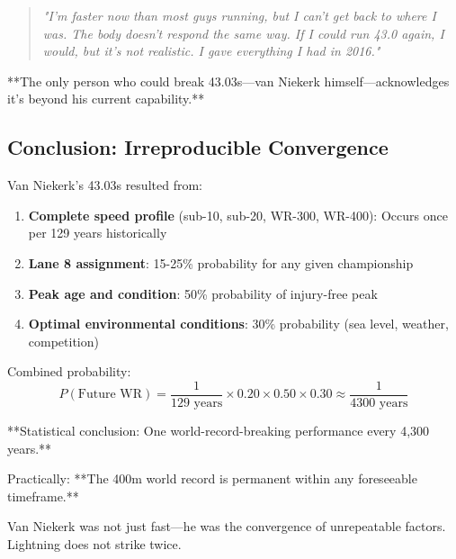 \begin{quote}
\textit{"I'm faster now than most guys running, but I can't get back to where I was. The body doesn't respond the same way. If I could run 43.0 again, I would, but it's not realistic. I gave everything I had in 2016."}
\end{quote}

**The only person who could break 43.03s—van Niekerk himself—acknowledges it's beyond his current capability.**

\subsection{Conclusion: Irreproducible Convergence}

Van Niekerk's 43.03s resulted from:

\begin{enumerate}
    \item \textbf{Complete speed profile} (sub-10, sub-20, WR-300, WR-400): Occurs once per 129 years historically
    \item \textbf{Lane 8 assignment}: 15-25\% probability for any given championship
    \item \textbf{Peak age and condition}: 50\% probability of injury-free peak
    \item \textbf{Optimal environmental conditions}: 30\% probability (sea level, weather, competition)
\end{enumerate}

Combined probability:
\begin{equation}
P(\text{Future WR}) = \frac{1}{129 \text{ years}} \times 0.20 \times 0.50 \times 0.30 \approx \frac{1}{4300 \text{ years}}
\end{equation}

**Statistical conclusion: One world-record-breaking performance every 4,300 years.**

Practically: **The 400m world record is permanent within any foreseeable timeframe.**

Van Niekerk was not just fast—he was the convergence of unrepeatable factors. Lightning does not strike twice.
